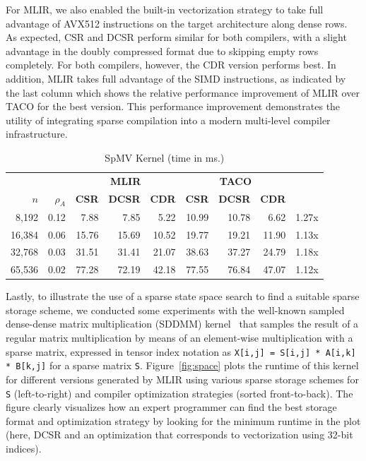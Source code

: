 \documentclass[10pt]{article}
\newcommand{\tabel}[1]{\begin{table}[#1]\begin{center}}
\newcommand{\lebat}[2]{\end{center}\caption{#1}\label{#2}\end{table}}
\begin{document}
For MLIR, we also enabled the built-in vectorization strategy to take full advantage of AVX512 instructions on the target architecture along dense rows. As expected, CSR and DCSR perform similar for both compilers, with a slight advantage in the doubly compressed format due to skipping empty rows completely. For both compilers, however, the CDR version performs best. In addition, MLIR takes full advantage of the SIMD instructions, as indicated by the last column which shows the relative performance improvement of MLIR over TACO for the best version. This performance improvement demonstrates the utility of integrating sparse compilation into a modern multi-level compiler infrastructure.

\tabel{t}
\footnotesize
\begin{tabular}{|rr|rrr|rrr|l|}
\hline
\multicolumn{2}{|c|}{}              &
\multicolumn{3}{|c|}{\textbf{MLIR}} &
\multicolumn{3}{|c|}{\textbf{TACO}} &  \\
$n$ & $\rho_A$ & \textbf{CSR} & \textbf{DCSR} & \textbf{CDR} & \textbf{CSR} & \textbf{DCSR} & \textbf{CDR} & \\
\hline
 8,192 & 0.12 &  7.88 &  7.85 & 5.22 & 10.99 & 10.78  & 6.62  & 1.27x \\
16,384 & 0.06 & 15.76 & 15.69 & 10.52 & 19.77 & 19.21 & 11.90 & 1.13x \\
32,768 & 0.03 & 31.51 & 31.41 & 21.07 & 38.63 & 37.27 & 24.79 & 1.18x \\
65,536 & 0.02 & 77.28 & 72.19 & 42.18 & 77.55 & 76.84 & 47.07 & 1.12x \\
\hline
\end{tabular}
\lebat{SpMV Kernel (time in ms.)}{tab:sparsematvec}

Lastly, to illustrate the use of a sparse state space search to find a suitable sparse storage scheme, we conducted some experiments with the well-known sampled dense-dense matrix multiplication (SDDMM) kernel~\cite{sampleddd} that samples the result of a regular matrix multiplication by means of an element-wise multiplication with a sparse matrix, expressed in tensor index notation as \texttt{X[i,j] = S[i,j] * A[i,k] * B[k,j]} for a sparse matrix \texttt{S}. Figure~\ref{fig:space} plots the runtime of this kernel for different versions generated by MLIR using various sparse storage schemes for \texttt{S} (left-to-right) and compiler optimization strategies (sorted front-to-back). The figure clearly visualizes how an expert programmer can find the best storage format and optimization strategy by looking for the minimum runtime in the plot (here, DCSR and an optimization that corresponds to vectorization using 32-bit indices).
\end{document}
